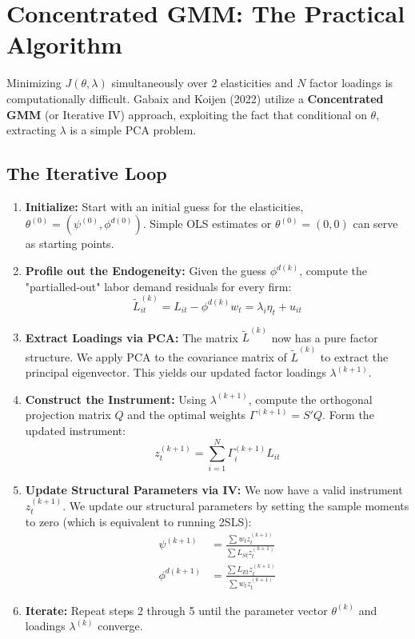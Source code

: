 \documentclass[11pt]{article}
\begin{document}
\section{Concentrated GMM: The Practical Algorithm}
Minimizing $J(\theta, \lambda)$ simultaneously over $2$ elasticities and $N$ factor loadings is computationally difficult. Gabaix and Koijen (2022) utilize a \textbf{Concentrated GMM} (or Iterative IV) approach, exploiting the fact that conditional on $\theta$, extracting $\lambda$ is a simple PCA problem.

\subsection{The Iterative Loop}
\begin{enumerate}
    \item \textbf{Initialize:} Start with an initial guess for the elasticities, $\theta^{(0)} = (\psi^{(0)}, \phi^{d(0)})$. Simple OLS estimates or $\theta^{(0)} = (0,0)$ can serve as starting points.
    
    \item \textbf{Profile out the Endogeneity:} Given the guess $\phi^{d(k)}$, compute the "partialled-out" labor demand residuals for every firm:
    \begin{equation}
        \tilde{L}_{it}^{(k)} = L_{it} - \phi^{d(k)} w_t = \lambda_i \eta_t + u_{it}
    \end{equation}
    
    \item \textbf{Extract Loadings via PCA:} The matrix $\tilde{L}^{(k)}$ now has a pure factor structure. We apply PCA to the covariance matrix of $\tilde{L}^{(k)}$ to extract the principal eigenvector. This yields our updated factor loadings $\lambda^{(k+1)}$.
    
    \item \textbf{Construct the Instrument:} Using $\lambda^{(k+1)}$, compute the orthogonal projection matrix $Q$ and the optimal weights $\Gamma^{(k+1)} = S'Q$. Form the updated instrument:
    \begin{equation}
        z_t^{(k+1)} = \sum_{i=1}^N \Gamma_i^{(k+1)} L_{it}
    \end{equation}
    
    \item \textbf{Update Structural Parameters via IV:} We now have a valid instrument $z_t^{(k+1)}$. We update our structural parameters by setting the sample moments to zero (which is equivalent to running 2SLS):
    \begin{align}
        \psi^{(k+1)} &= \frac{\sum w_t z_t^{(k+1)}}{\sum L_{St} z_t^{(k+1)}} \\[0.5cm]
        \phi^{d(k+1)} &= \frac{\sum L_{Et} z_t^{(k+1)}}{\sum w_t z_t^{(k+1)}}
    \end{align}
    
    \item \textbf{Iterate:} Repeat steps 2 through 5 until the parameter vector $\theta^{(k)}$ and loadings $\lambda^{(k)}$ converge.
\end{enumerate}
\end{document}
